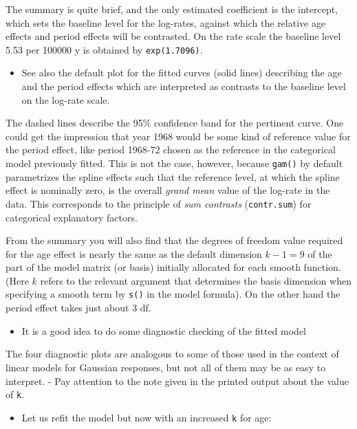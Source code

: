 \documentclass[
]{book}
\providecommand{\tightlist}{%
  \setlength{\itemsep}{0pt}\setlength{\parskip}{0pt}}
\begin{document}
The summary is quite brief, and the only estimated coefficient is the
intercept, which sets the baseline level for the log-rates, against
which the relative age effects and period effects will be contrasted.
On the rate scale the baseline level 5.53 per 100000 y is obtained by
\texttt{exp(1.7096)}.

\begin{itemize}
\tightlist
\item
  See also the default plot for the fitted curves (solid lines)
  describing the age and the period effects which are interpreted as
  contrasts to the baseline level on the log-rate scale.
\end{itemize}

The dashed lines describe the 95\% confidence band for the pertinent
curve. One could get the impression that year 1968 would be some kind
of reference value for the period effect, like period 1968-72
chosen as the reference in the categorical
model previously fitted. This is not the case, however, because
\texttt{gam()} by default parametrizes the spline effects such that the
reference level, at which the spline effect is nominally zero, is the
overall \emph{grand mean} value of the log-rate in the data. This
corresponds to the principle of \emph{sum contrasts} (\texttt{contr.sum})
for categorical explanatory factors.

From the summary you will also find that the degrees of freedom value
required for the age effect is nearly the same as the default
dimension \(k-1 = 9\) of the part of the model matrix (or basis)
initially allocated for each smooth function. (Here \(k\) refers to the
relevant argument that determines the basis dimension when specifying
a smooth term by \texttt{s()} in the model formula). On the other
hand the period effect takes just about 3 df.

\begin{itemize}
\tightlist
\item
  It is a good idea to do some diagnostic checking of the fitted
  model
\end{itemize}

The four diagnostic plots are analogous to some of those used in
the context of linear models for Gaussian responses, but not all of them
may be as easy to interpret. - Pay attention to the note
given in the printed output about the value of \texttt{k}.

\begin{itemize}
\tightlist
\item
  Let us refit the model but now with an increased \texttt{k} for age:
\end{itemize}
\end{document}
